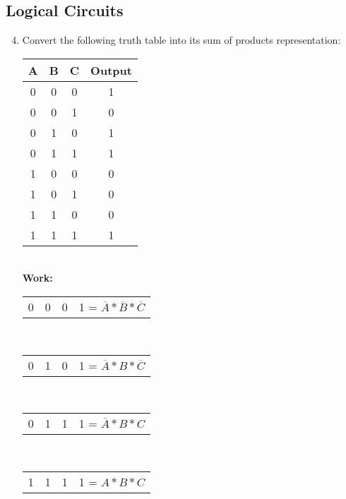 \documentclass[11pt]{article}
\begin{document}
\subsection{Logical Circuits}
\begin{enumerate}
    \setcounter{enumi}{3}
    \item Convert the following truth table into its sum of products representation:\\
    \begin{tabular}{c c c | c}\\
            A & B & C & Output \\
        \hline
            0 & 0 & 0 & 1 \\
            0 & 0 & 1 & 0 \\
            0 & 1 & 0 & 1 \\
            0 & 1 & 1 & 1 \\
            1 & 0 & 0 & 0 \\
            1 & 0 & 1 & 0 \\
            1 & 1 & 0 & 0 \\
            1 & 1 & 1 & 1 \\
    \end{tabular}\\
    \textbf{Work:}
    \begin{center}
        \begin{tabular}{c c c | c}
            0 & 0 & 0 & 1  = $\overline{A} * \overline{B} * \overline{C}$\\
        \end{tabular}\\
        \begin{tabular}{c c c | c}\\
            0 & 1 & 0 & 1  = $\overline{A} * B * \overline{C}$\\
        \end{tabular}\\
        \begin{tabular}{c c c | c}\\
            0 & 1 & 1 & 1  = $\overline{A} * B * C$\\
        \end{tabular}\\
        \begin{tabular}{c c c | c}\\
            1 & 1 & 1 & 1  = $A * B * C$\\
        \end{tabular}\\

\end{center}
\end{enumerate}
\end{document}

